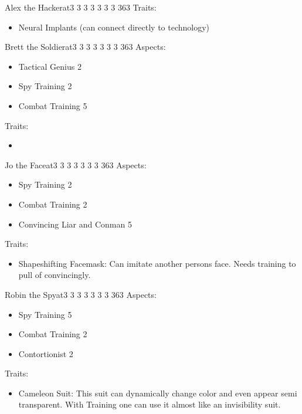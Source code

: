\documentclass[11pt]{article}
\begin{document}
{\begin{npc}{Alex the Hacker}{at}{3 3 3 3 3 3 3 3}{63}
Traits:
\begin{itemize}
\item Neural Implants (can connect directly to technology)
\end{itemize}
\end{npc}

\begin{npc}{Brett the Soldier}{at}{3 3 3 3 3 3 3 3}{63}
Aspects:
\begin{itemize}
\item Tactical Genius 2
\item Spy Training 2
\item Combat Training 5
\end{itemize}
\columnbreak

Traits:
\begin{itemize}
\item 
\end{itemize}
\end{npc}


\begin{npc}{Jo the Face}{at}{3 3 3 3 3 3 3 3}{63}
Aspects:
\begin{itemize}
\item Spy Training 2
\item Combat Training 2
\item Convincing Liar and Conman 5
\end{itemize}
\columnbreak

Traits:
\begin{itemize}
\item Shapeshifting Facemask: Can imitate another persons face. Needs training to pull of convincingly.
\end{itemize}
\end{npc}

\begin{npc}{Robin the Spy}{at}{3 3 3 3 3 3 3 3}{63}
Aspects:
\begin{itemize}
\item Spy  Training 5
\item Combat Training 2
\item Contortionist 2
\end{itemize}
\columnbreak

Traits:
\begin{itemize}
\item Cameleon Suit: This suit can dynamically change color and even appear semi transparent. With Training one can use it almost like an invisibility suit.
\end{itemize}
\end{npc}
}
\end{document}
